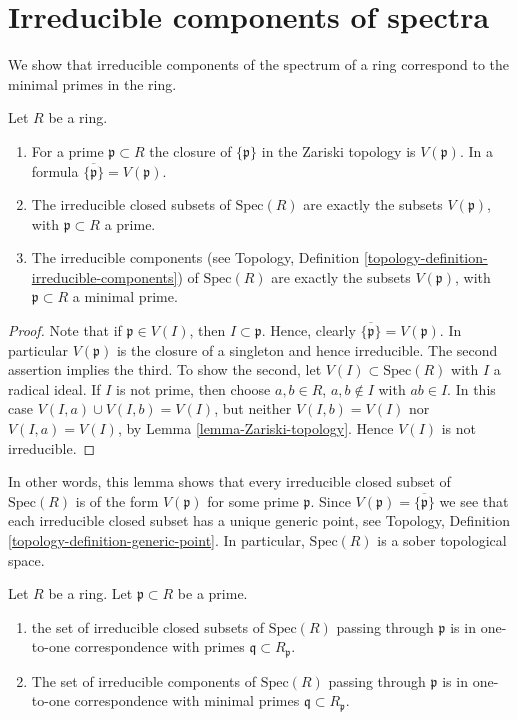 \section{Irreducible components of spectra}
\label{section-irreducible}

\noindent
We show that irreducible components of
the spectrum of a ring correspond to the
minimal primes in the ring.

\begin{lemma}
\label{lemma-irreducible}
Let $R$ be a ring.
\begin{enumerate}
\item For a prime $\mathfrak p \subset R$ the closure
of $\{\mathfrak p\}$ in the Zariski topology is $V(\mathfrak p)$.
In a formula $\overline{\{\mathfrak p\}} = V(\mathfrak p)$.
\item The irreducible closed subsets of $\text{Spec}(R)$ are
exactly the subsets $V(\mathfrak p)$, with $\mathfrak p \subset R$
a prime.
\item The irreducible components (see Topology,
Definition \ref{topology-definition-irreducible-components})
of $\text{Spec}(R)$ are  exactly the subsets $V(\mathfrak p)$,
with $\mathfrak p \subset R$ a minimal prime.
\end{enumerate}
\end{lemma}

\begin{proof}
Note that if $ \mathfrak p \in V(I)$, then
$I \subset \mathfrak p$. Hence,
clearly $\overline{\{\mathfrak p\}} = V(\mathfrak p)$.
In particular $V(\mathfrak p)$ is the closure of
a singleton and hence irreducible.
The second assertion implies the third.
To show the second, let
$V(I) \subset \text{Spec}(R)$ with $I$ a radical ideal.
If $I$ is not prime, then choose $a, b\in R$, $a, b\not \in I$
with $ab\in I$. In this case $V(I, a) \cup V(I, b) = V(I)$,
but neither $V(I, b) = V(I)$ nor $V(I, a) = V(I)$, by
Lemma \ref{lemma-Zariski-topology}. Hence $V(I)$ is not
irreducible.
\end{proof}

\noindent
In other words, this lemma shows that every irreducible closed
subset of $\text{Spec}(R)$ is of the form $V(\mathfrak p)$ for
some prime $\mathfrak p$. Since $V(\mathfrak p) = \overline{\{\mathfrak p\}}$
we see that each irreducible closed subset has a unique generic point,
see Topology, Definition \ref{topology-definition-generic-point}.
In particular, $\text{Spec}(R)$ is a sober topological space.

\begin{lemma}
\label{lemma-irreducible-components-containing-x}
Let $R$ be a ring. Let $\mathfrak p \subset R$ be a prime.
\begin{enumerate}
\item the set of irreducible closed subsets of $\text{Spec}(R)$
passing through $\mathfrak p$ is in one-to-one correspondence with
primes $\mathfrak q \subset R_{\mathfrak p}$.
\item The set of irreducible components of $\text{Spec}(R)$ passing through
$\mathfrak p$ is in one-to-one correspondence with minimal
primes $\mathfrak q \subset R_{\mathfrak p}$.
\end{enumerate}
\end{lemma}

